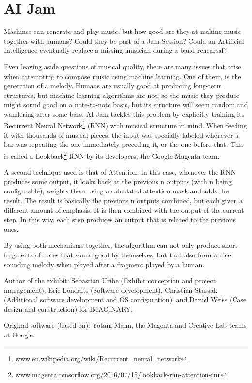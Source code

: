 \section{AI Jam}
Machines can generate and play music, but how good are they at making music together with humans? Could they be part of a Jam Session? Could an Artificial Intelligence eventually replace a missing musician during a band rehearsal?

Even leaving aside questions of musical quality, there are many issues that arise when attempting to compose music using machine learning. One of them, is the generation of a melody. Humans are usually good at producing long-term structures, but machine learning algorithms are not, so the music they produce might sound good on a note-to-note basis, but its structure will seem random and wandering after some bars. AI Jam tackles this problem by explicitly training its Recurrent Neural Network\footnote{\url{www.en.wikipedia.org/wiki/Recurrent_neural_network}} (RNN) with musical structure in mind. When feeding it with thousands of musical pieces, the input was specially labeled whenever a bar was repeating the one immediately preceding it, or the one before that. This is called a Lookback\footnote{\url{www.magenta.tensorflow.org/2016/07/15/lookback-rnn-attention-rnn}} RNN by its developers, the Google Magenta team.

A second technique used is that of Attention. In this case, whenever the RNN produces some output, it looks back at the previous n outputs (with n being configurable), weights them using a calculated attention mask and adds the result. The result is basically the previous n outputs combined, but each given a different amount of emphasis. It is then combined with the output of the current step. In this way, each step produces an output that is related to the previous ones.

By using both mechanisms together, the algorithm can not only produce short fragments of notes that sound good by themselves, but that also form a nice sounding melody when played after a fragment played by a human.

\begin{sectcredits}


\item[Author of the exhibit:] Sebastian Uribe (Exhibit conception and project management), Eric Londaits (Software development), Christian Stussak (Additional software development and OS configuration), and Daniel Weiss (Case design and construction) for IMAGINARY.
\item[Original software (based on):] Yotam Mann, the Magenta and Creative Lab teams at Google.
\end{sectcredits}
